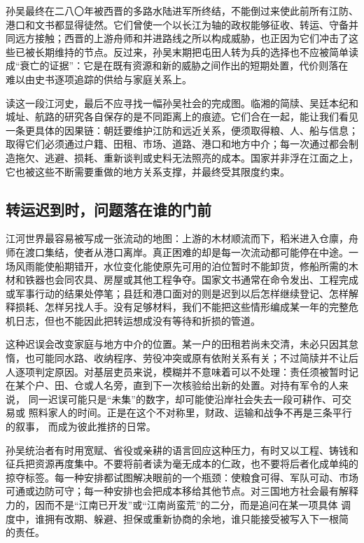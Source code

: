 孙吴最终在二八〇年被西晋的多路水陆进军所终结，不能倒过来使此前所有江防、
港口和文书都显得徒然。它们曾使一个以长江为轴的政权能够征收、转运、守备并
同远方接触；西晋的上游舟师和并进路线之所以构成威胁，也正因为它们冲击了这
些已被长期维持的节点。反过来，孙吴末期把屯田人转为兵的选择也不应被简单读
成“衰亡的证据”：它是在既有资源和新的威胁之间作出的短期处置，代价则落在
难以由史书逐项追踪的供给与家庭关系上。

读这一段江河史，最后不应寻找一幅孙吴社会的完成图。临湘的简牍、吴廷本纪和
城址、航路的研究各自保存的是不同距离上的痕迹。它们合在一起，能让我们看见
一条更具体的因果链：朝廷要维护江防和远近关系，便须取得粮、人、船与信息；
取得它们必须通过户籍、田租、市场、道路、港口和地方中介；每一次通过都会制
造拖欠、逃避、损耗、重新谈判或史料无法照亮的成本。国家并非浮在江面之上，
它也被这些不断需要重做的地方关系支撑，并最终受其限度约束。

\subsection{转运迟到时，问题落在谁的门前}

江河世界最容易被写成一张流动的地图：上游的木材顺流而下，稻米进入仓廪，舟
师在渡口集结，使者从港口离岸。真正困难的却是每一次流动都可能停在中途。一
场风雨能使船期错开，水位变化能使原先可用的泊位暂时不能卸货，修船所需的木
材和铁器也会同农具、房屋或其他工程争夺。国家文书通常在命令发出、工程完成
或军事行动的结果处停笔；县廷和港口面对的则是迟到以后怎样继续登记、怎样解
释损耗、怎样另找人手。没有足够材料，我们不能把这些情形编成某一年的完整危
机日志，但也不能因此把转运想成没有等待和折损的管道。

这种迟误会改变家庭与地方中介的位置。某一户的田租若尚未交清，未必只因其怠
惰，也可能同水路、收纳程序、劳役冲突或原有依附关系有关；不过简牍并不让后
人逐项判定原因。对基层吏员来说，模糊并不意味着可以不处理：责任须被暂时记
在某个户、田、仓或人名旁，直到下一次核验给出新的处置。对持有军令的人来说，
同一迟误可能只是“未集”的数字，却可能使沿岸社会失去一段可耕作、可交易或
照料家人的时间。正是在这个不对称里，财政、运输和战争不再是三条平行的叙事，
而成为彼此推挤的日常。

孙吴统治者有时用宽赋、省役或亲耕的语言回应这种压力，有时又以工程、铸钱和
征兵把资源再度集中。不要将前者读为毫无成本的仁政，也不要将后者化成单纯的
掠夺标签。每一种安排都试图解决眼前的一个瓶颈：使粮食可得、军队可动、市场
可通或边防可守；每一种安排也会把成本移给其他节点。对三国地方社会最有解释
力的，因而不是“江南已开发”或“江南尚蛮荒”的二分，而是追问在某一项具体
调度中，谁拥有改期、躲避、担保或重新协商的余地，谁只能接受被写入下一根简
的责任。

